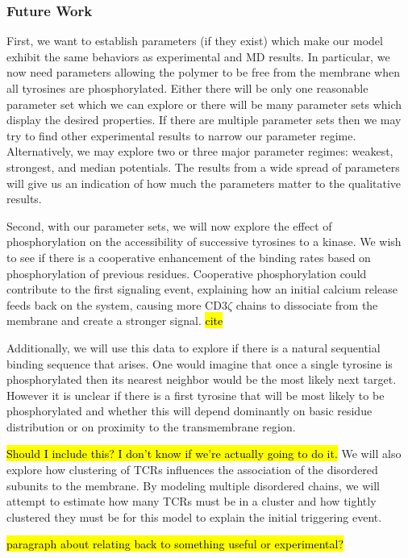 \documentclass[../../AdvancementSummary.tex]{subfiles}
\begin{document}
\subsubsection{Future Work}

First, we want to establish parameters (if they exist) which make our model exhibit the same behaviors as experimental and MD results. In particular, we now need parameters allowing the polymer to be free from the membrane when all tyrosines are phosphorylated. Either there will be only one reasonable parameter set which we can explore or there will be many parameter sets which display the desired properties.  If there are multiple parameter sets then we may try to find other experimental results to narrow our parameter regime. Alternatively, we may explore two or three major parameter regimes: weakest, strongest, and median potentials. The results from a wide spread of parameters will give us an indication of how much the parameters matter to the qualitative results.  

Second, with our parameter sets, we will now explore the effect of phosphorylation on the accessibility of successive tyrosines to a kinase.  We wish to see if there is a cooperative enhancement of the binding rates based on phosphorylation of previous residues.  Cooperative phosphorylation could contribute to the first signaling event, explaining how an initial calcium release feeds back on the system, causing more CD3$\zeta$ chains to dissociate from the membrane and create a stronger signal. \hl{cite}

Additionally, we will use this data to explore if there is a natural sequential binding sequence that arises.  One would imagine that once a single tyrosine is phosphorylated then its nearest neighbor would be the most likely next target.  However it is unclear if there is a first tyrosine that will be most likely to be phosphorylated and whether this will depend dominantly on basic residue distribution or on proximity to the transmembrane region. 

\hl{Should I include this?  I don't know if we're actually going to do it.}
We will also explore how clustering of TCRs influences the association of the disordered subunits to the membrane. By modeling multiple disordered chains, we will attempt to estimate how many TCRs must be in a cluster and how tightly clustered they must be for this model to explain the initial triggering event.

\hl{paragraph about relating back to something useful or experimental?}
\end{document}
